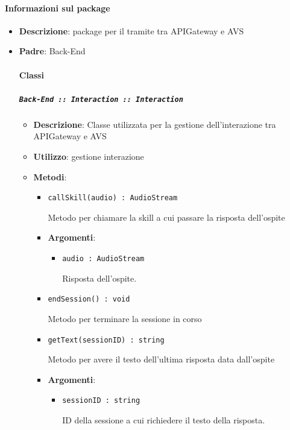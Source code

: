 \documentclass[../DefinizioneDiProdotto.tex]{subfiles}
\begin{document}
	\paragraph{Informazioni sul package}\begin{itemize}\item \textbf{Descrizione}: package per il tramite tra APIGateway e AVS\item \textbf{Padre}: Back-End\paragraph{Classi}
	\subparagraph{\texttt{Back-End :: Interaction :: Interaction}}
	\begin{itemize}\item \textbf{Descrizione}: Classe utilizzata per la gestione dell'interazione tra APIGateway e AVS
	\item \textbf{Utilizzo}: gestione interazione
	\item \textbf{Metodi}:
	\begin{itemize}
	\item \texttt{callSkill(audio) : AudioStream}\

	 Metodo per chiamare la skill a cui passare la risposta dell'ospite

	\item \textbf{Argomenti}:
	\begin{itemize}
	\item \texttt{audio : AudioStream}\

	 Risposta dell'ospite.
	\end{itemize}
	\end{itemize}\vspace{0.5em}
	\begin{itemize}
	\item \texttt{endSession() : void}\

	 Metodo per terminare la sessione in corso
	\end{itemize}\vspace{0.5em}
	\begin{itemize}
	\item \texttt{getText(sessionID) : string}\

	 Metodo per avere il testo dell'ultima risposta data dall'ospite

	\item \textbf{Argomenti}:
	\begin{itemize}
	\item \texttt{sessionID : string}\

	 ID della sessione a cui richiedere il testo della risposta.
	\end{itemize}
	\end{itemize}\vspace{0.5em}
	\end{itemize}\end{itemize}
\end{document}
